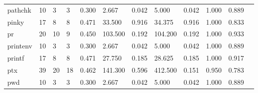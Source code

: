 \begin{longtable}{lp{1.00cm}p{1.00cm}p{1.00cm}p{1.00cm}p{1.00cm}p{1.00cm}p{1.00cm}p{1.00cm}p{1.00cm}p{1.00cm}p{1.00cm}}
pathchk   &                           10 &                  3 &                                 3 &                                      0.300 &                                  2.667 &                                        0.042 &                             5.000 &                                   0.042 &                        1.000 &                                        0.889 \\
pinky     &                           17 &                  8 &                                 8 &                                      0.471 &                                 33.500 &                                        0.916 &                            34.375 &                                   0.916 &                        1.000 &                                        0.833 \\
pr        &                           20 &                 10 &                                 9 &                                      0.450 &                                103.500 &                                        0.192 &                           104.200 &                                   0.192 &                        1.000 &                                        0.933 \\
printenv  &                           10 &                  3 &                                 3 &                                      0.300 &                                  2.667 &                                        0.042 &                             5.000 &                                   0.042 &                        1.000 &                                        0.889 \\
printf    &                           17 &                  8 &                                 8 &                                      0.471 &                                 27.750 &                                        0.185 &                            28.625 &                                   0.185 &                        1.000 &                                        0.917 \\
ptx       &                           39 &                 20 &                                18 &                                      0.462 &                                141.300 &                                        0.596 &                           412.500 &                                   0.151 &                        0.950 &                                        0.783 \\
pwd       &                           10 &                  3 &                                 3 &                                      0.300 &                                  2.667 &                                        0.042 &                             5.000 &                                   0.042 &                        1.000 &                                        0.889 \\

\end{longtable}

